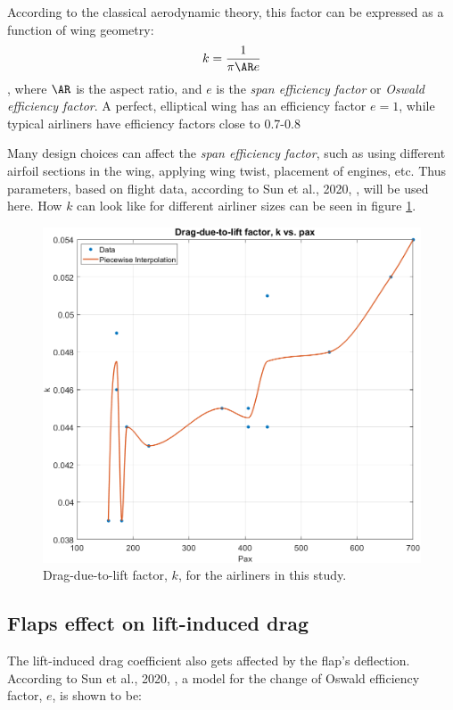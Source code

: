 \documentclass[english]{kththesis}
\begin{document}
According to the classical aerodynamic theory, this factor can be expressed as a function of wing geometry:
\begin{equation}
\label{eq:k}
k = \frac{1}{\pi \AR e}
\end{equation}
, where $\AR$ is the aspect ratio, and $e$ is the \textit{span efficiency factor} or \textit{Oswald efficiency factor}. A perfect, elliptical wing has an efficiency factor $e=1$, while typical airliners have efficiency factors close to 0.7-0.8

Many design choices can affect the \textit{span efficiency factor}, such as using different airfoil sections in the wing, applying wing twist, placement of engines, etc. Thus parameters, based on flight data, according to Sun et al., 2020, \cite{Sun2020}, will be used here. How $k$ can look like for different airliner sizes can be seen in figure \ref{fig:kPax}.

\begin{figure}[!ht]
    \centering
    \includegraphics[width=1\textwidth]{Epictures/kvsPax.png}
    \caption{Drag-due-to-lift factor, $k$, for the airliners in this study.}
    \label{fig:kPax}
\end{figure}


\subsection{Flaps effect on lift-induced drag}
\label{sec:flapsoninduceddrag}
The lift-induced drag coefficient also gets affected by the flap's deflection. According to Sun et al., 2020, \cite{Sun2020}, a model for the change of Oswald efficiency factor, $e$, is shown to be:
\end{document}
